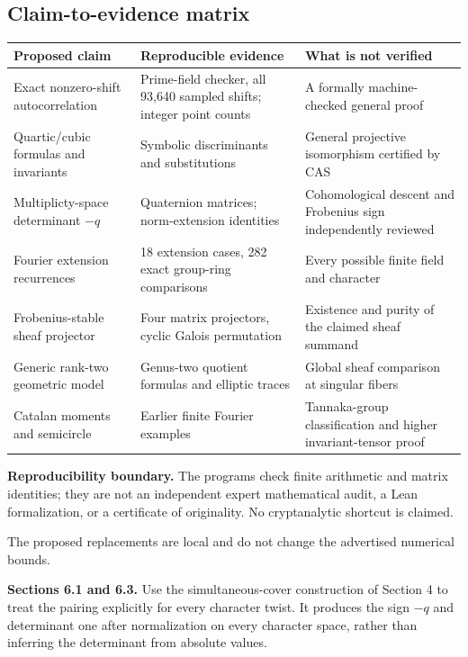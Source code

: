 \documentclass[11pt,a4paper]{article}
\numberwithin{equation}{section}
\begin{document}
\subsection*{Claim-to-evidence matrix}
\begin{center}\small
\begin{tabular}{p{.30\linewidth}p{.30\linewidth}p{.31\linewidth}}
\toprule
Proposed claim & Reproducible evidence & What is not verified\\
\midrule
Exact nonzero-shift autocorrelation & Prime-field checker, all 93,640 sampled shifts; integer point counts & A formally machine-checked general proof\\
Quartic/cubic formulas and invariants & Symbolic discriminants and substitutions & General projective isomorphism certified by CAS\\
Multiplicty-space determinant \(-q\) & Quaternion matrices; norm-extension identities & Cohomological descent and Frobenius sign independently reviewed\\
Fourier extension recurrences & 18 extension cases, 282 exact group-ring comparisons & Every possible finite field and character\\
Frobenius-stable sheaf projector & Four matrix projectors, cyclic Galois permutation & Existence and purity of the claimed sheaf summand\\
Generic rank-two geometric model & Genus-two quotient formulas and elliptic traces & Global sheaf comparison at singular fibers\\
Catalan moments and semicircle & Earlier finite Fourier examples & Tannaka-group classification and higher invariant-tensor proof\\
\bottomrule
\end{tabular}
\end{center}
\noindent\textbf{Reproducibility boundary.} The programs check finite arithmetic and matrix identities; they are not an independent expert mathematical audit, a Lean formalization, or a certificate of originality. No cryptanalytic shortcut is claimed.

The proposed replacements are local and do not change the advertised numerical bounds.

\textbf{Sections 6.1 and 6.3.} Use the simultaneous-cover construction of Section 4 to treat the pairing explicitly for every character twist. It produces the sign $-q$ and determinant one after normalization on every character space, rather than inferring the determinant from absolute values.
\end{document}
